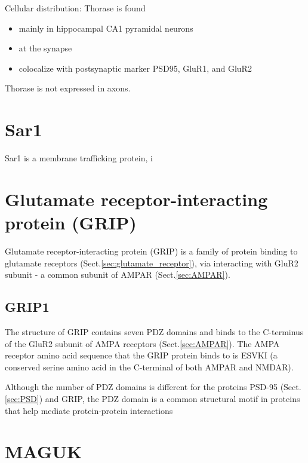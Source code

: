 Cellular distribution: Thorase is found
\begin{itemize}
  \item mainly in hippocampal CA1 pyramidal neurons
  \item at the synapse
  \item colocalize with postsynaptic marker PSD95, GluR1, and GluR2
\end{itemize}
Thorase is not expressed in axons. 



\section{Sar1}
\label{sec:Sar1}

Sar1 is a membrane trafficking protein, i

\section{Glutamate receptor-interacting protein (GRIP)}
\label{sec:GRIP}

Glutamate receptor-interacting protein (GRIP) is a family of protein binding to
glutamate receptors (Sect.\ref{sec:glutamate_receptor}), via interacting with
GluR2 subunit - a common subunit of AMPAR (Sect.\ref{sec:AMPAR}). 

\subsection{GRIP1}
\label{sec:GRIP1}

The structure of GRIP contains seven PDZ domains and binds to the C-terminus of
the GluR2 subunit of AMPA receptors (Sect.\ref{sec:AMPAR}). The AMPA receptor
amino acid sequence that the GRIP protein binds to is ESVKI (a conserved serine amino acid in the
C-terminal of both AMPAR and NMDAR).

Although the number of PDZ domains is different for the proteins PSD-95
(Sect.\ref{sec:PSD}) and GRIP, the PDZ domain is a common structural motif in
proteins that help mediate protein-protein interactions


\section{MAGUK}
\label{sec:MAGUK}


